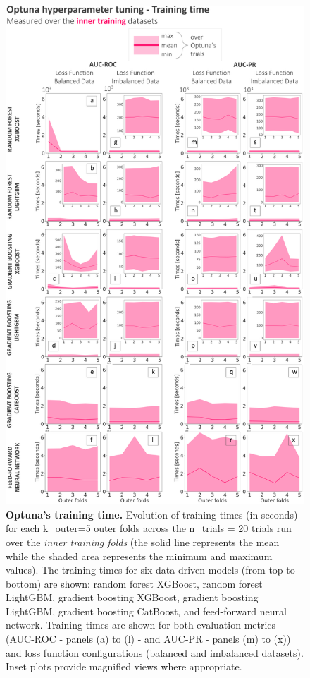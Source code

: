 \documentclass[nhess, manuscript]{copernicus}
\begin{document}
\begin{figure}[t]
\includegraphics[width=12cm]{figures/optuna_time_training.png}
\caption{\textbf{Optuna's training time.} Evolution of training times (in seconds) for each k\_outer=5 outer folds across the n\_trials = 20 trials run over the \textit{inner training folds} (the solid line represents the mean while the shaded area represents the minimum and maximum values). The training times for six data-driven models (from top to bottom) are shown: random forest XGBoost, random forest LightGBM, gradient boosting XGBoost, gradient boosting LightGBM, gradient boosting CatBoost, and feed-forward neural network. Training times are shown for both evaluation metrics (AUC-ROC - panels (a) to (l) - and AUC-PR - panels (m) to (x)) and loss function configurations (balanced and imbalanced datasets). Inset plots provide magnified views where appropriate.}
\label{fig:optuna_time_training}
\end{figure}
\end{document}
